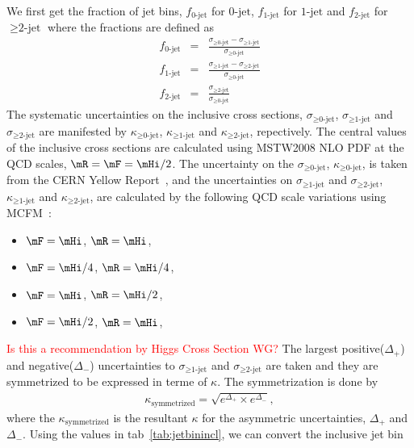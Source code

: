 We first get the fraction of jet bins, $f_\textrm{0-jet}$ for $\textrm{0-jet}$, 
$f_\textrm{1-jet}$ for $\textrm{1-jet}$ 
and $f_\textrm{2-jet}$ for $\ge\textrm{2-jet}$ where the fractions are defined as 
\begin{eqnarray} 
f_\textrm{0-jet} 
&=&  
\frac{\sigma_{\ge\textrm{0-jet}} - \sigma_{\ge\textrm{1-jet}}}{\sigma_{\ge\textrm{0-jet}}} \\
f_\textrm{1-jet} 
&=&  
\frac{\sigma_{\ge\textrm{1-jet}} - \sigma_{\ge\textrm{2-jet}}}{\sigma_{\ge\textrm{0-jet}}} \\
f_\textrm{2-jet} 
&=&  
\frac{\sigma_{\ge\textrm{2-jet}}}{\sigma_{\ge\textrm{0-jet}}} 
\end{eqnarray}  
The systematic uncertainties on the inclusive cross sections, 
$\sigma_{\ge\textrm{0-jet}}$, $\sigma_{\ge\textrm{1-jet}}$ and $\sigma_{\ge\textrm{2-jet}}$ are 
manifested by $\kappa_{\ge\textrm{0-jet}}$, $\kappa_{\ge\textrm{1-jet}}$ and $\kappa_{\ge\textrm{2-jet}}$, repectively.
The central values of the inclusive cross sections are calculated 
using MSTW2008 NLO PDF at the QCD scales, $\mR=\mF=\mHi/2$.
The uncertainty on the $\sigma_{\ge\textrm{0-jet}}$, $\kappa_{\ge\textrm{0-jet}}$, is taken from the 
CERN Yellow Report~\cite{Dittmaier:1318996}, and the uncertainties 
on $\sigma_{\ge\textrm{1-jet}}$ and $\sigma_{\ge\textrm{2-jet}}$, $\kappa_{\ge\textrm{1-jet}}$ and $\kappa_{\ge\textrm{2-jet}}$, are 
calculated by the following QCD scale variations using MCFM~\cite{}: 
\begin{itemize}
\item $\mF = \mHi $, $\mR = \mHi$,
\item $\mF = \mHi / 4$, $\mR = \mHi / 4$,
\item $\mF = \mHi $, $\mR = \mHi / 2$,
\item $\mF = \mHi / 2$, $\mR= \mHi $,
\end{itemize}
\textcolor{red}{Is this a recommendation by Higgs Cross Section WG?} 
The largest positive($\Delta_{+}$) and negative($\Delta_{-}$) uncertainties 
to $\sigma_{\ge\textrm{1-jet}}$ and $\sigma_{\ge\textrm{2-jet}}$ are taken 
and they are symmetrized to be expressed in terme of $\kappa$. 
The symmetrization is done by 
\begin{eqnarray} 
  \kappa_{\mathrm{symmetrized}} = \sqrt{e^{\Delta_{+}} \times e^{\Delta_{-}}} ,
\end{eqnarray} 
where the $\kappa_{\mathrm{symmetrized}}$ is the resultant $\kappa$
for the asymmetric uncertainties, $\Delta_{+}$ and $\Delta_{-}$.
Using the values in tab~\ref{tab:jetbinincl}, we can convert the inclusive jet bin 

